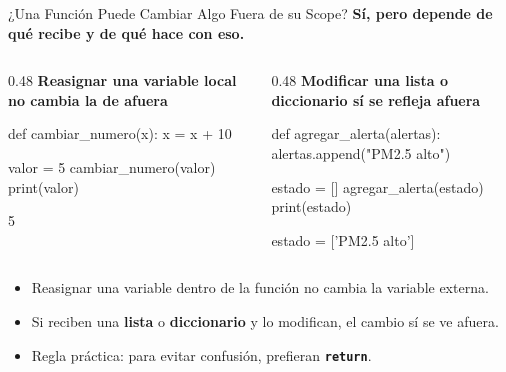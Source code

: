 \documentclass[aspectratio=169, 11pt]{beamer}
\begin{document}
\begin{frame}[fragile,shrink=30]{¿Una Función Puede Cambiar Algo Fuera de su Scope?}
  \vspace{-6pt}
  {\footnotesize\color{arcaDark}\bfseries
    Sí, pero depende de \textbf{qué recibe} y de \textbf{qué hace} con eso.}

  \vspace{2pt}
  \begin{columns}[T]
    \begin{column}{0.48\textwidth}
      {\scriptsize\color{arcaRed}\bfseries\faTimesCircle\hspace{4pt}
        Reasignar una variable local no cambia la de afuera}
      \begin{pyblock}
def cambiar_numero(x):
    x = x + 10

valor = 5
cambiar_numero(valor)
print(valor)
      \end{pyblock}
      \vspace{-2pt}
      \begin{outputblock}
5
      \end{outputblock}
    \end{column}

    \begin{column}{0.48\textwidth}
      {\scriptsize\color{codeGreen}\bfseries\faCheckCircle\hspace{4pt}
        Modificar una lista o diccionario sí se refleja afuera}
      \begin{pyblock}
def agregar_alerta(alertas):
    alertas.append("PM2.5 alto")

estado = []
agregar_alerta(estado)
print(estado)
      \end{pyblock}
      \vspace{-2pt}
      \begin{outputblock}
estado = ['PM2.5 alto']
      \end{outputblock}
    \end{column}
  \end{columns}

  \vspace{1pt}
  {\scriptsize\color{textMuted}
  \begin{itemize}\setlength{\itemsep}{3pt}
    \item[{\color{arcaRed}\scriptsize\faArrowRight}]
      Reasignar una variable dentro de la función
      no cambia la variable externa.
    \item[{\color{arcaRed}\scriptsize\faArrowRight}]
      Si reciben una \textbf{lista} o \textbf{diccionario}
      y lo modifican, el cambio sí se ve afuera.
    \item[{\color{arcaRed}\scriptsize\faLightbulb}]
      Regla práctica: para evitar confusión,
      prefieran \textbf{\texttt{return}}.
  \end{itemize}
  }
\end{frame}
\end{document}
